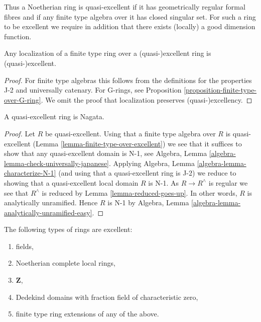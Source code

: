 \noindent
Thus a Noetherian ring is quasi-excellent if it has geometrically regular
formal fibres and if any finite type algebra over it has closed singular
set. For such a ring to be excellent we require in addition that there
exists (locally) a good dimension function.

\begin{lemma}
\label{lemma-finite-type-over-excellent}
Any localization of a finite type ring over a (quasi-)excellent ring
is (quasi-)excellent.
\end{lemma}

\begin{proof}
For finite type algebras this follows from the definitions for
the properties J-2 and universally catenary. For G-rings, see
Proposition \ref{proposition-finite-type-over-G-ring}. We omit
the proof that localization preserves (quasi-)excellency.
\end{proof}

\begin{lemma}
\label{lemma-quasi-excellent-nagata}
A quasi-excellent ring is Nagata.
\end{lemma}

\begin{proof}
Let $R$ be quasi-excellent.
Using that a finite type algebra over $R$ is quasi-excellent
(Lemma \ref{lemma-finite-type-over-excellent}) we see that
it suffices to show that any quasi-excellent domain is N-1, see
Algebra, Lemma \ref{algebra-lemma-check-universally-japanese}.
Applying Algebra, Lemma \ref{algebra-lemma-characterize-N-1}
(and using that a quasi-excellent ring is J-2) we reduce
to showing that a quasi-excellent local domain $R$ is N-1.
As $R \to R^\wedge$ is regular we see that $R^\wedge$
is reduced by Lemma \ref{lemma-reduced-goes-up}.
In other words, $R$ is analytically unramified.
Hence $R$ is N-1 by
Algebra, Lemma \ref{algebra-lemma-analytically-unramified-easy}.
\end{proof}

\begin{proposition}
\label{proposition-ubiquity-excellent}
The following types of rings are excellent:
\begin{enumerate}
\item fields,
\item Noetherian complete local rings,
\item $\mathbf{Z}$,
\item Dedekind domains with fraction field of characteristic zero,
\item finite type ring extensions of any of the above.
\end{enumerate}
\end{proposition}


